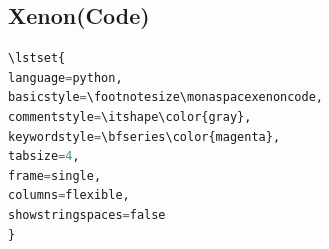 \documentclass[a4paper]{scrartcl}
\begin{document}




\pagebreak

\subsection{Xenon(Code)}

\begin{lstlisting}[language=python,basicstyle=\footnotesize\monaspacexenoncode,commentstyle=\itshape\color{gray},keywordstyle=\bfseries\color{magenta},tabsize=4,frame=single,columns=flexible,showstringspaces=false]
\lstset{
language=python,
basicstyle=\footnotesize\monaspacexenoncode,
commentstyle=\itshape\color{gray},
keywordstyle=\bfseries\color{magenta},
tabsize=4,
frame=single,
columns=flexible,
showstringspaces=false
}
\end{lstlisting}





%
%
%
%
%
%
%
%
%
\end{document}
